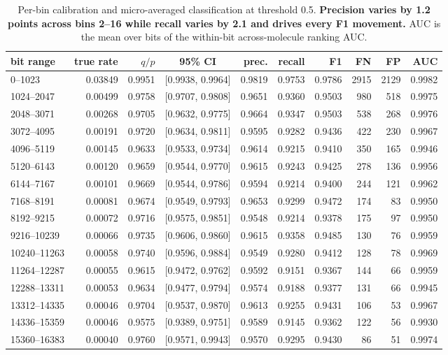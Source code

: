 \documentclass[11pt,a4paper]{article}
\begin{document}
\begin{table}[htbp]
\centering
\small
\caption{Per-bin calibration and micro-averaged classification at threshold 0.5. \textbf{Precision
varies by 1.2 points across bins 2--16 while recall varies by 2.1 and drives every F1 movement.}
AUC is the mean over bits of the within-bit across-molecule ranking AUC.}
\label{tab:main}
\setlength{\tabcolsep}{4.6pt}
\begin{tabular}{lrrcrrrrrr}
\toprule
bit range & true rate & $q/p$ & 95\% CI & prec. & recall & F1 & FN & FP & AUC \\
\midrule
0--1023 & 0.03849 & 0.9951 & [0.9938, 0.9964] & 0.9819 & 0.9753 & 0.9786 & 2915 & 2129 & 0.9982 \\
1024--2047 & 0.00499 & 0.9758 & [0.9707, 0.9808] & 0.9651 & 0.9360 & 0.9503 & 980 & 518 & 0.9975 \\
2048--3071 & 0.00268 & 0.9705 & [0.9632, 0.9775] & 0.9664 & 0.9347 & 0.9503 & 538 & 268 & 0.9976 \\
3072--4095 & 0.00191 & 0.9720 & [0.9634, 0.9811] & 0.9595 & 0.9282 & 0.9436 & 422 & 230 & 0.9967 \\
4096--5119 & 0.00145 & 0.9633 & [0.9533, 0.9734] & 0.9614 & 0.9215 & 0.9410 & 350 & 165 & 0.9946 \\
5120--6143 & 0.00120 & 0.9659 & [0.9544, 0.9770] & 0.9615 & 0.9243 & 0.9425 & 278 & 136 & 0.9956 \\
6144--7167 & 0.00101 & 0.9669 & [0.9544, 0.9786] & 0.9594 & 0.9214 & 0.9400 & 244 & 121 & 0.9962 \\
7168--8191 & 0.00081 & 0.9674 & [0.9549, 0.9793] & 0.9653 & 0.9299 & 0.9472 & 174 & 83 & 0.9950 \\
8192--9215 & 0.00072 & 0.9716 & [0.9575, 0.9851] & 0.9548 & 0.9214 & 0.9378 & 175 & 97 & 0.9950 \\
9216--10239 & 0.00066 & 0.9735 & [0.9606, 0.9860] & 0.9615 & 0.9358 & 0.9485 & 130 & 76 & 0.9959 \\
10240--11263 & 0.00058 & 0.9740 & [0.9596, 0.9884] & 0.9549 & 0.9280 & 0.9412 & 128 & 78 & 0.9969 \\
11264--12287 & 0.00055 & 0.9615 & [0.9472, 0.9762] & 0.9592 & 0.9151 & 0.9367 & 144 & 66 & 0.9959 \\
12288--13311 & 0.00053 & 0.9634 & [0.9477, 0.9794] & 0.9574 & 0.9188 & 0.9377 & 131 & 66 & 0.9945 \\
13312--14335 & 0.00046 & 0.9704 & [0.9537, 0.9870] & 0.9613 & 0.9255 & 0.9431 & 106 & 53 & 0.9967 \\
14336--15359 & 0.00046 & 0.9575 & [0.9389, 0.9751] & 0.9589 & 0.9145 & 0.9362 & 122 & 56 & 0.9930 \\
15360--16383 & 0.00040 & 0.9760 & [0.9571, 0.9943] & 0.9570 & 0.9295 & 0.9430 & 86 & 51 & 0.9974 \\
\bottomrule
\end{tabular}
\end{table}
\end{document}
